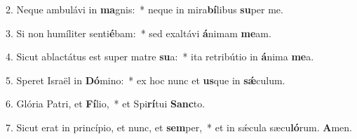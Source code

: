 2. Neque ambulávi in \textbf{ma}gnis:~*  neque in mira\textbf{bí}libus \textbf{su}per me.\

3. Si non humíliter senti\textbf{é}bam:~*  sed exaltávi \textbf{á}nimam \textbf{me}am.\

4. Sicut ablactátus est super matre \textbf{su}a:~*  ita retribútio in \textbf{á}nima \textbf{me}a.\

5. Speret Israël in \textbf{Dó}mino:~*  ex hoc nunc et \textbf{us}que in \textbf{sǽ}culum.\

6. Glória Patri, et \textbf{Fí}lio,~*  et Spi\textbf{rí}tui \textbf{Sanc}to.\

7. Sicut erat in princípio, et nunc, et \textbf{sem}per,~*  et in sǽcula sæcu\textbf{ló}rum. \textbf{A}men.\

